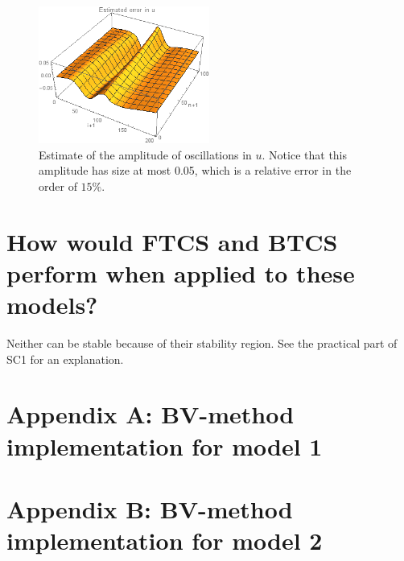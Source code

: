 \documentclass{article}
\renewcommand{\(}{\left(}
\renewcommand{\)}{\right)}
\begin{document}
\begin{figure}
\centering
\includegraphics[width=0.5\textwidth]{errorFinal.png}
\caption{Estimate of the amplitude of oscillations in $u$. Notice that this amplitude has size at most 0.05, which is a relative error in the order of $15\%$.}
\label{fig:errorFinal}
\end{figure}

\section*{How would FTCS and BTCS perform when applied to these models?}
Neither can be stable because of their stability region. See the practical part of SC1 for an explanation.

\section*{Appendix A: BV-method implementation for model 1}


\section*{Appendix B: BV-method implementation for model 2}

\end{document}
